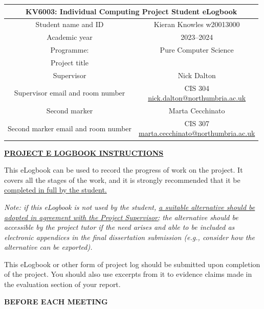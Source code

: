 \documentclass[../CHEFCookingHelper.tex]{subfiles}
\begin{document}
\raggedbottom

\begin{table}[h!]
    \centering
    \begin{tabular}{cc}\toprule
        \multicolumn{2}{c}{KV6003: Individual Computing Project Student eLogbook} \\\midrule
        Student name and ID & Kieran Knowles w20013000 \\
        Academic year & 2023--2024 \\
        Programme: & Pure Computer Science \\
        Project title & \chef{} \\
        Supervisor & Nick Dalton \\
        Supervisor email and room number & \makecell[c]{
            CIS 304 \\
            \href{mailto:nick.dalton@northumbria.ac.uk}{nick.dalton@northumbria.ac.uk}
        } \\
        Second marker & Marta Cecchinato \\
        Second marker email and room number & \makecell[c]{
            CIS 307 \\
            \href{mailto:marta.cecchinato@northumbria.ac.uk}{marta.cecchinato@northumbria.ac.uk}
        } \\\bottomrule
    \end{tabular}
\end{table}

\textbf{\underline{PROJECT E LOGBOOK INSTRUCTIONS}}

This eLogbook can be used to record the progress of work on the project. It covers all the stages of the
work, and it is strongly recommended that it be \ul{completed in full by the student.}

\textit{
    Note: if this eLogbook is not used by the student, \ul{a suitable alternative should be adopted in agreement with
    the Project Supervisor;} the alternative should be accessible by the project tutor if the need arises and able
    to be included as electronic appendices in the final dissertation submission (e.g., consider how the alternative
    can be exported).
}

This eLogbook or other form of project log should be submitted upon completion of the project.
You should also use excerpts from it to evidence claims made in the evaluation section of your report.

\textbf{BEFORE EACH MEETING}
\end{document}
